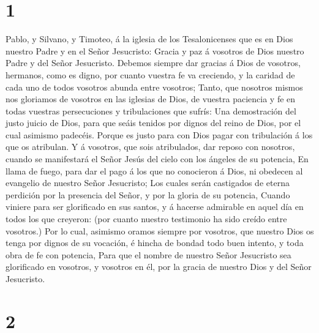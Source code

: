 \hypertarget{section}{%
\section{1}\label{section}}

 Pablo, y Silvano, y Timoteo, á la iglesia de los
Tesalonicenses que es en Dios nuestro Padre y en el Señor Jesucristo:
 Gracia y paz á vosotros de Dios nuestro Padre y del Señor
Jesucristo.  Debemos siempre dar gracias á Dios de
vosotros, hermanos, como es digno, por cuanto vuestra fe va creciendo, y
la caridad de cada uno de todos vosotros abunda entre vosotros;
 Tanto, que nosotros mismos nos gloriamos de vosotros en
las iglesias de Dios, de vuestra paciencia y fe en todas vuestras
persecuciones y tribulaciones que sufrís:  Una
demostración del justo juicio de Dios, para que seáis tenidos por dignos
del reino de Dios, por el cual asimismo padecéis.  Porque
es justo para con Dios pagar con tribulación á los que os atribulan.
 Y á vosotros, que sois atribulados, dar reposo con
nosotros, cuando se manifestará el Señor Jesús del cielo con los ángeles
de su potencia,  En llama de fuego, para dar el pago á los
que no conocieron á Dios, ni obedecen al evangelio de nuestro Señor
Jesucristo;  Los cuales serán castigados de eterna
perdición por la presencia del Señor, y por la gloria de su potencia,
 Cuando viniere para ser glorificado en sus santos, y á
hacerse admirable en aquel día en todos los que creyeron: (por cuanto
nuestro testimonio ha sido creído entre vosotros.)  Por
lo cual, asimismo oramos siempre por vosotros, que nuestro Dios os tenga
por dignos de su vocación, é hincha de bondad todo buen intento, y toda
obra de fe con potencia,  Para que el nombre de nuestro
Señor Jesucristo sea glorificado en vosotros, y vosotros en él, por la
gracia de nuestro Dios y del Señor Jesucristo.

\hypertarget{section-1}{%
\section{2}\label{section-1}}

